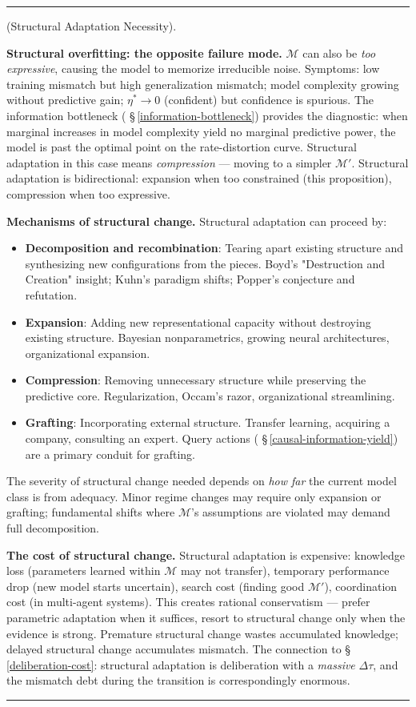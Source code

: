 \documentclass[11pt,oneside]{article}
\newcounter{claim}[section]
\renewcommand{\theclaim}{\thesection.\arabic{claim}}
\newenvironment{segment}[2]{%
  \refstepcounter{claim}%
  \bigskip\noindent\hrule\smallskip
  \noindent{\bfseries #1~\theclaim}\enskip(#2).\par\smallskip
  \noindent\ignorespaces
}{%
  \par\smallskip\noindent\hrule\bigskip
}
\newenvironment{theorem}[1][]{\begin{segment}{Theorem}{#1}}{\end{segment}}
\begin{document}
\begin{theorem}[Structural Adaptation Necessity]
\textbf{Structural overfitting: the opposite failure mode.} $\mathcal{M}$ can also be \textit{too expressive}, causing the model to memorize irreducible noise. Symptoms: low training mismatch but high generalization mismatch; model complexity growing without predictive gain; $\eta^* \to 0$ (confident) but confidence is spurious. The information bottleneck ( \S\,\ref{information-bottleneck}) provides the diagnostic: when marginal increases in model complexity yield no marginal predictive power, the model is past the optimal point on the rate-distortion curve. Structural adaptation in this case means \textit{compression} — moving to a simpler $\mathcal{M}'$. Structural adaptation is bidirectional: expansion when too constrained (this proposition), compression when too expressive.

\textbf{Mechanisms of structural change.} Structural adaptation can proceed by:

\begin{itemize}
  \item \textbf{Decomposition and recombination}: Tearing apart existing structure and synthesizing new configurations from the pieces. Boyd's "Destruction and Creation" insight; Kuhn's paradigm shifts; Popper's conjecture and refutation.
  \item \textbf{Expansion}: Adding new representational capacity without destroying existing structure. Bayesian nonparametrics, growing neural architectures, organizational expansion.
  \item \textbf{Compression}: Removing unnecessary structure while preserving the predictive core. Regularization, Occam's razor, organizational streamlining.
  \item \textbf{Grafting}: Incorporating external structure. Transfer learning, acquiring a company, consulting an expert. Query actions ( \S\,\ref{causal-information-yield}) are a primary conduit for grafting.
\end{itemize}


The severity of structural change needed depends on \textit{how far} the current model class is from adequacy. Minor regime changes may require only expansion or grafting; fundamental shifts where $\mathcal{M}$'s assumptions are violated may demand full decomposition.

\textbf{The cost of structural change.} Structural adaptation is expensive: knowledge loss (parameters learned within $\mathcal{M}$ may not transfer), temporary performance drop (new model starts uncertain), search cost (finding good $\mathcal{M}'$), coordination cost (in multi-agent systems). This creates rational conservatism — prefer parametric adaptation when it suffices, resort to structural change only when the evidence is strong. Premature structural change wastes accumulated knowledge; delayed structural change accumulates mismatch. The connection to \S\,\ref{deliberation-cost}: structural adaptation is deliberation with a \textit{massive} $\Delta\tau$, and the mismatch debt during the transition is correspondingly enormous.


\end{theorem}
\end{document}
